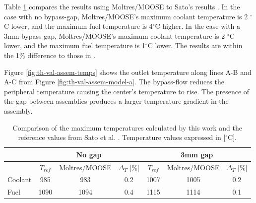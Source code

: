 Table \ref{tab:th-val-assem-results} compares the results using Moltres/MOOSE to Sato's results \cite{sato_computational_2010}.
In the case with no bypass-gap, Moltres/MOOSE's maximum coolant temperature is 2 $^{\circ}$C lower, and the maximum fuel temperature is 4$^{\circ}$C higher.
In the case with a 3mm bypass-gap, Moltres/MOOSE's maximum coolant temperature is 2 $^{\circ}$C lower, and the maximum fuel temperature is 1$^{\circ}$C lower.
The results are within the 1\% difference to those in \cite{sato_computational_2010}.

Figure \ref{fig:th-val-assem-temps} shows the outlet temperature along lines A-B and A-C from Figure \ref{fig:th-val-assem-model-a}.
The bypass-flow reduces the peripheral temperature causing the center's temperature to rise.
The presence of the gap between assemblies produces a larger temperature gradient in the assembly.

\begin{table}[htbp!]
  \centering
  \caption{Comparison of the maximum temperatures calculated by this work and the reference values from Sato et al. \cite{sato_computational_2010}. Temperature values expressed in [$^{\circ}$C].}
  \label{tab:th-val-assem-results}
\begin{tabular}{lcccccc}
\toprule
        & \multicolumn{3}{c}{No gap} & \multicolumn{3}{c}{3mm gap} \\
\midrule
        & $T_{ref}$ & Moltres/MOOSE  & $\Delta_T$ [\%] & $T_{ref}$ & Moltres/MOOSE & $\Delta_T$ [\%] \\
\midrule
Coolant & 985       & 983   & 0.2    & 1007      & 1005 & 0.2   \\  
Fuel    & 1090      & 1094  & 0.4    & 1115      & 1114 & 0.1   \\
\bottomrule
\end{tabular}
\end{table}

